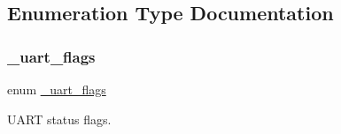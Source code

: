 \subsection{Enumeration Type Documentation}
\mbox{\label{group__uart__driver_ga259a53f363288115306a45d08fc66eb8}} 
\subsubsection{\texorpdfstring{\_uart\_flags}{\_uart\_flags}}
{\footnotesize\ttfamily enum \mbox{\hyperlink{group__uart__driver_ga259a53f363288115306a45d08fc66eb8}{\+\_\+uart\+\_\+flags}}}



U\+A\+RT status flags. 

